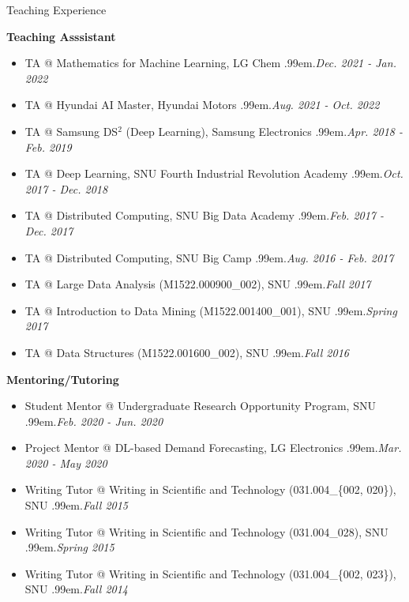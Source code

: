 \documentclass{resume} %
\makeatletter
\newcommand \Dotfill {\leavevmode \cleaders \hb@xt@ .99em{\hss .\hss }\hfill \kern \z@}
\makeatother
\begin{document}

\begin{rSection}{Teaching Experience}

\textbf{Teaching Asssistant}
\begin{itemize}[noitemsep]
	\item TA @ Mathematics for Machine Learning, LG Chem \smallskip \Dotfill \emph{Dec. 2021 - Jan. 2022}
	\item TA @ Hyundai AI Master, Hyundai Motors \smallskip \Dotfill \emph{Aug. 2021 - Oct. 2022}
	\item TA @ Samsung DS$^2$ (Deep Learning), Samsung Electronics \smallskip \Dotfill \emph{Apr. 2018 - Feb. 2019}
	\item TA @ Deep Learning, SNU Fourth Industrial Revolution Academy \smallskip \Dotfill \emph{Oct. 2017 - Dec. 2018}
	\item TA @ Distributed Computing, SNU Big Data Academy \smallskip \Dotfill \emph{Feb. 2017 - Dec. 2017}
	\item TA @ Distributed Computing, SNU Big Camp \smallskip \Dotfill \emph{Aug. 2016 - Feb. 2017}
	\item TA @ Large Data Analysis (M1522.000900\_002), SNU \smallskip \Dotfill \emph{Fall 2017}
	\item TA @ Introduction to Data Mining (M1522.001400\_001), SNU \smallskip \Dotfill \emph{Spring 2017}
	\item TA @ Data Structures (M1522.001600\_002), SNU \smallskip \Dotfill \emph{Fall 2016}
\end{itemize}

\textbf{Mentoring/Tutoring}
\begin{itemize}[noitemsep]
	\item Student Mentor @ Undergraduate Research Opportunity Program, SNU \smallskip \Dotfill \emph{Feb. 2020 - Jun. 2020}
	\item Project Mentor @ DL-based Demand Forecasting, LG Electronics \smallskip \Dotfill \emph{Mar. 2020 - May 2020}
	\item Writing Tutor @ Writing in Scientific and Technology (031.004\_\{002, 020\}), SNU \smallskip \Dotfill \emph{Fall 2015}
	\item Writing Tutor @ Writing in Scientific and Technology (031.004\_028), SNU \smallskip \Dotfill \emph{Spring 2015}
	\item Writing Tutor @ Writing in Scientific and Technology (031.004\_\{002, 023\}), SNU \smallskip \Dotfill \emph{Fall 2014}
\end{itemize}

\end{rSection}
\end{document}
